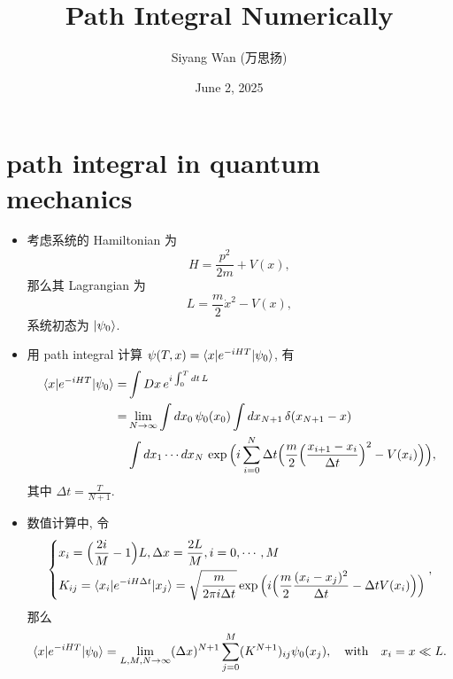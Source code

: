 \documentclass[10pt, a4paper]{article}
\title{\Huge \textbf{Path Integral Numerically}}
\author{Siyang Wan (万思扬)}
\date{June 2, 2025}
\numberwithin{equation}{section}
\begin{document}
	\maketitle
	
	\tableofcontents
	
	\section{path integral in quantum mechanics}
	\begin{itemize}
		\item 考虑系统的 Hamiltonian 为
		\begin{equation}
			H = \frac{p^2}{2 m} + V(x),
		\end{equation}
		那么其 Lagrangian 为
		\begin{equation}
			L = \frac{m}{2} \dot{x}^2 - V(x),
		\end{equation}
		系统初态为 $\ket{\psi_0}$.
		
		\item 用 path integral 计算 $\psi(T, x) = \braket{x | e^{- i H T} | \psi_0}$, 有
		\begin{align}
			\braket{x | e^{- i H T} | \psi_0} =& \int Dx \, e^{i \int_0^T dt \, L} \notag \\
			=& \lim_{N \rightarrow \infty} \int dx_0 \, \psi_0(x_0) \int dx_{N + 1} \, \delta(x_{N + 1} - x) \notag \\
			& \int dx_1 \cdots dx_N \, \exp \Big( i \sum_{i = 0}^N \Delta t \Big( \frac{m}{2} \Big( \frac{x_{i + 1} - x_i}{\Delta t} \Big)^2 - V(x_i) \Big) \Big),
		\end{align}
		其中 $\Delta t = \frac{T}{N + 1}$.
		
		\item 数值计算中, 令
		\begin{equation}
			\begin{dcases}
				x_i = \Big( \frac{2 i}{M} - 1 \Big) L, \Delta x = \frac{2 L}{M}, i = 0, \cdots, M \\
				K_{i j} = \braket{x_i | e^{- i H \Delta t} | x_j} = \sqrt{\frac{m}{2 \pi i \Delta t}} \exp \Big( i \Big( \frac{m}{2} \frac{(x_i - x_j)^2}{\Delta t} - \Delta t V(x_i) \Big) \Big)
			\end{dcases},
		\end{equation}
		那么
		\begin{equation} \label{1.5}
			\braket{x | e^{- i H T} | \psi_0} = \lim_{L, M, N \rightarrow \infty} (\Delta x)^{N + 1} \sum_{j = 0}^M (K^{N + 1})_{i j} \psi_0(x_j), \quad \text{with} \quad x_i = x \ll L.
		\end{equation}
	\end{itemize}
	
\end{document}
